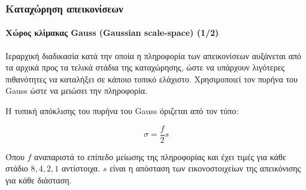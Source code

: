 \documentclass{beamer}
\begin{document}
\begin{frame}
\frametitle{Καταχώρηση απεικονίσεων}
\framesubtitle{Χώρος κλίμακας Gauss (Gaussian scale-space) (1/2)}

Ιεραρχική διαδικασία κατά την οποία η πληροφορία των απεικονίσεων αυξάνεται
από τα αρχικά προς τα τελικά στάδια της καταχώρησης, ώστε να υπάρχουν λιγότερες
πιθανότητες να καταλήξει σε κάποιο τοπικό ελάχιστο. Χρησιμοποιεί τον πυρήνα του
Gauss ώστε να μειώσει την πληροφορία.


Η τυπική απόκλισης του πυρήνα του Gauss όριζεται από τον τύπο:

\begin{equation*}
    \sigma = \frac {f} {2} s
\end{equation*}

Όπου $f$ αναπαριστά το επίπεδο μείωσης της πληροφορίας και έχει τιμές για κάθε
στάδιο $8,4,2,1$ αντίστοιχα. $s$ είναι η απόσταση των εικονοστοιχείων της
απεικόνισης για κάθε διάσταση.


\end{frame}
\end{document}
